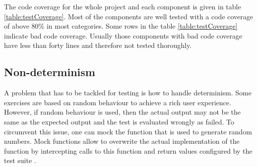 The code coverage for the whole project and each component is given in table \ref{table:testCoverage}. Most of the components are well tested with a code coverage of above 80\% in most categories. Some rows in the table \ref{table:testCoverage} indicate bad code coverage. Usually those components with bad code coverage have less than forty lines and therefore not tested thoroughly. 
 
\subsection*{Non-determinism}
A problem that has to be tackled for testing is how to handle determinism. Some exercises are based on random behaviour to achieve a rich user experience. However, if random behaviour is used, then the actual output may not be the same as the expected output and the test is evaluated wrongly as failed. To circumvent this issue, one can mock the function that is used to generate random numbers. Mock functions allow to overwrite the actual implementation of the function by intercepting calls to this function and return values configured by the test suite \cite{Jest}. 

